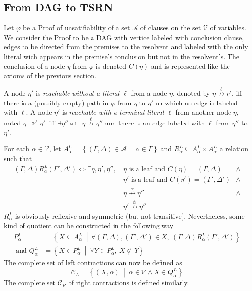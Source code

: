 \documentclass{article}
\newcommand{\ens}[2]{\left\{ #1 ~ \middle| ~ #2 \right\}}
\newcommand{\varSet}{\mathcal{V}}
\newcommand{\axiomSet}{\mathcal{A}}
\newcommand{\conSet}{\mathcal{C}}
\newcommand{\Proof}{\varphi}
\newcommand{\node}{\eta}
\newcommand{\conc}[1]{C\left(#1\right)}
\newcommand{\dual}[1]{\overline{#1}}
\newcommand{\nreach}[3]{#1 \overset{#2}{\nrightarrow} #3}
\newcommand{\treach}[3]{#1 \twoheadrightarrow^{#2} #3}
\begin{document}
\subsection{From DAG to TSRN}

Let $\Proof$ be a Proof of unsatifiability of a set $\axiomSet$ of clauses on the set $\varSet$ of
variables. We consider the Proof to be a DAG with vertice labeled with conclusion clause, edges to
be directed from the premises to the resolvent and labeled with the only literal wich appears in the
premise's conclusion but not in the resolvent's. The conclusion of a node $\node$ from $\Proof$ is
denoted $\conc{\node}$ and is represented like the axioms of the previous section.

A node $\node'$ is \emph{reachable without a literal $\ell$} from a node $\node$, denoted by
$\nreach{\node}{\ell}{\node'}$, iff there is a (possibly empty) path in $\Proof$ from $\node$ to
$\node'$ on which no edge is labeled with $\ell$.
A node $\node'$ is \emph{reachable with a terminal literal $\ell$} from another node $\node$, noted
$\treach{\node}{\ell}{\node'}$, iff $\exists \node''$ s.t. $\nreach{\node}{\ell}{\node''}$ and there
is an edge labeled with $\ell$ from $\node''$ to $\node'$.

For each $\alpha \in \varSet$, let $A_\alpha^L = \ens{(\Gamma,\Delta) \in \axiomSet}{\alpha \in \Gamma}$
and $R_\alpha^L \subseteq A_\alpha^L \times A_\alpha^L$ a relation such that
\begin{align*}
  (\Gamma,\Delta) R_\alpha^L (\Gamma', \Delta') \Longleftrightarrow \exists \node,\node',\node'',~
    & \node  \text{ is a leaf and } \conc{\node}  = (\Gamma,  \Delta)  &\wedge \\
    & \node' \text{ is a leaf and } \conc{\node'} = (\Gamma', \Delta') &\wedge \\
    & \nreach{\node} {\dual{\alpha}}{\node''} &\wedge \\
    & \nreach{\node'}{\dual{\alpha}}{\node''} &
\end{align*}
$R_\alpha^L$ is obviously reflexive and symmetric (but not transitive). Nevertheless, some kind of
quotient can be constructed in the following way
\begin{align*}
  P_\alpha^L &=
    \ens{X \subseteq A_\alpha^L}
        {\forall (\Gamma,\Delta),(\Gamma',\Delta') \in X ,~
          (\Gamma,\Delta) R_\alpha^L (\Gamma',\Delta')} \\
  \text{ and }
  Q_\alpha^L &= \ens{X \in P_\alpha^L}{\forall Y \in P_\alpha^L ,~ X \not\subset Y}
\end{align*}
The complete set of left contractions can now be defined as
$$ \conSet_L = \ens{(X,\alpha)}{\alpha \in \varSet \wedge X \in Q_\alpha^L} $$
The complete set $\conSet_R$ of right contractions is defined similarly.
\end{document}
